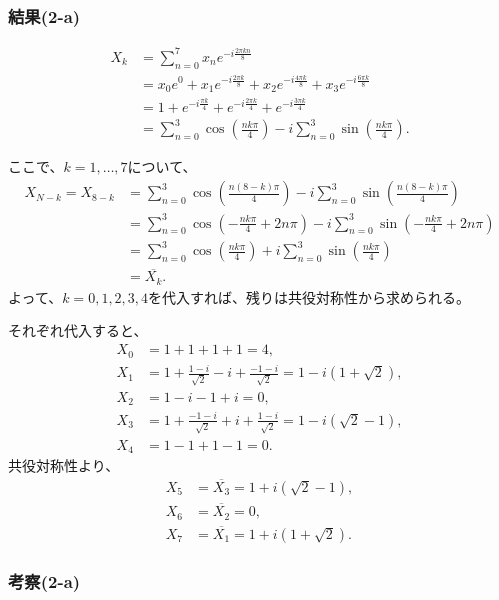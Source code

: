 \documentclass[a4j]{jarticle}
\begin{document}
\subsubsection{結果(2-a)}

\[
  \begin{aligned}
    X_k
    &=\sum_{n=0}^{7}x_n e^{-i\frac{2\pi kn}{8}}\\
    &=x_0e^0+x_1e^{-i\frac{2\pi k}{8}}
      +x_2e^{-i\frac{4\pi k}{8}}+x_3e^{-i\frac{6\pi k}{8}}\\
    &=1+e^{-i\frac{\pi k}{4}}+e^{-i\frac{2\pi k}{4}}
      +e^{-i\frac{3\pi k}{4}}\\
    &=\sum_{n=0}^{3}\cos\left(\frac{nk\pi}{4}\right)
      -i\sum_{n=0}^{3}\sin\left(\frac{nk\pi}{4}\right).
  \end{aligned}
\]

ここで、$k=1,\ldots,7$について、
\[
  \begin{aligned}
    X_{N-k}=X_{8-k}
    &=\sum_{n=0}^{3}\cos\left(\frac{n(8-k)\pi}{4}\right)
      -i\sum_{n=0}^{3}\sin\left(\frac{n(8-k)\pi}{4}\right)\\
    &=\sum_{n=0}^{3}\cos\left(-\frac{nk\pi}{4}+2n\pi\right)
      -i\sum_{n=0}^{3}\sin\left(-\frac{nk\pi}{4}+2n\pi\right)\\
    &=\sum_{n=0}^{3}\cos\left(\frac{nk\pi}{4}\right)
      +i\sum_{n=0}^{3}\sin\left(\frac{nk\pi}{4}\right)\\
    &=\overline{X_k}.
  \end{aligned}
\]
よって、$k=0,1,2,3,4$を代入すれば、残りは共役対称性から求められる。

それぞれ代入すると、
\[
  \begin{aligned}
    X_0&=1+1+1+1=4,\\
    X_1&=1+\frac{1-i}{\sqrt{2}}-i+\frac{-1-i}{\sqrt{2}}
      =1-i(1+\sqrt{2}),\\
    X_2&=1-i-1+i=0,\\
    X_3&=1+\frac{-1-i}{\sqrt{2}}+i+\frac{1-i}{\sqrt{2}}
      =1-i(\sqrt{2}-1),\\
    X_4&=1-1+1-1=0.
  \end{aligned}
\]
共役対称性より、
\[
  \begin{aligned}
    X_5&=\overline{X_3}=1+i(\sqrt{2}-1),\\
    X_6&=\overline{X_2}=0,\\
    X_7&=\overline{X_1}=1+i(1+\sqrt{2}).
  \end{aligned}
\]

\subsubsection{考察(2-a)}
\end{document}
